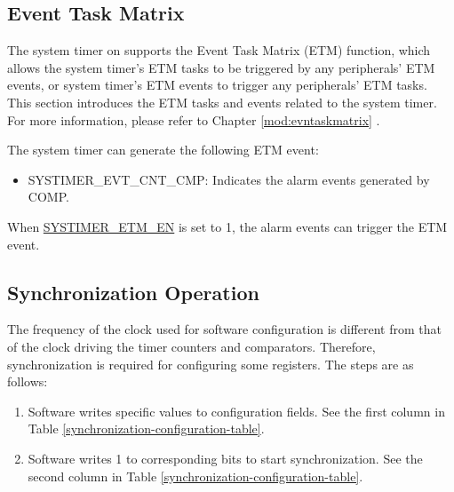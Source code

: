 \documentclass[main\_\_EN.tex]{subfiles}
\begin{document}
\subsection{Event Task Matrix}
The system timer on \chipname{} supports the Event Task Matrix (ETM) function, which allows the system timer's ETM tasks to be triggered by any peripherals' ETM events, or system timer's ETM events to trigger any peripherals' ETM tasks. This section introduces the ETM tasks and events related to the system timer. For more information, please refer to Chapter \ref{mod:evntaskmatrix} .

The system timer can generate the following ETM event:

\begin{itemize}
\item SYSTIMER\_EVT\_CNT\_CMP: Indicates the alarm events generated by COMP.
\end{itemize}

When \hyperref[fielddesc:SYSTIMERETMEN]{SYSTIMER\_ETM\_EN} is set to 1, the alarm events can trigger the ETM event.

\subsection{Synchronization Operation}
The frequency of the clock used for software configuration is different from that of the clock driving the timer counters and comparators. Therefore, synchronization is required for configuring some registers. The steps are as follows:

\begin{enumerate}
    \item Software writes specific values to configuration fields. See the first column in Table \ref{synchronization-configuration-table}.
    \item Software writes 1 to corresponding bits to start synchronization. See the second column in Table \ref{synchronization-configuration-table}.
\end{enumerate}
\end{document}
